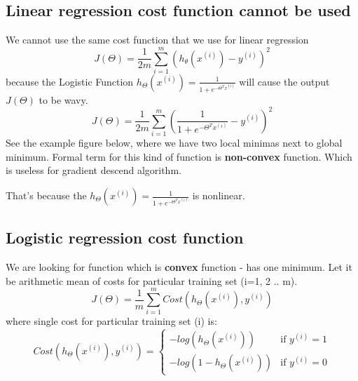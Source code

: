 \documentclass{article} %
\begin{document}
\subsection{Linear regression cost function cannot be used}
We cannot use the same cost function that we use for linear regression 
\begin{equation*}
J(\Theta) = \frac{1}{2m}\sum_{i=1}^{m}(h_\theta(x^{(i)})-y^{(i)})^2
\end{equation*}
because the Logistic Function $h_\Theta(x^{(i)}) = \frac{1}{1+e^{-{\Theta^Tx^{(i)}}}}$ will cause the output $J(\Theta)$ to be wavy. \\
\begin{equation}
J(\Theta) = \frac{1}{2m}\sum_{i=1}^{m}(\frac{1}{1+e^{-{\Theta^Tx^{(i)}}}}-y^{(i)})^2
\end{equation}
See the example figure below, where we have two local minimas next to global minimum. Formal term for this kind of function is \textbf{non-convex} function. Which is useless for gradient descend algorithm.  

\begin{center}
\end{center}
That's because the $h_\Theta(x^{(i)}) = \frac{1}{1+e^{-{\Theta^Tx^{(i)}}}}$ is nonlinear. 

\subsection{Logistic regression cost function}
We are looking for function which is \textbf{convex} function - has one minimum. Let it be arithmetic mean of costs for particular training set {(i=1, 2 .. m)}.
\begin{equation}
J(\Theta) = \frac{1}{m}\sum_{i=1}^{m}Cost(h_{\Theta}(x^{(i)}),y^{(i)})
\end{equation}
where single cost for particular training set {(i)} is:
\begin{equation}
Cost(h_{\Theta}(x^{(i)}),y^{(i)})=
\begin{cases}
-log(h_{\Theta}(x^{(i)})) & \text{if }y^{(i)}=1\\ 
-log(1-h_{\Theta}(x^{(i)})) & \text{if }y^{(i)}=0
\end{cases}
\end{equation}
\end{document}
